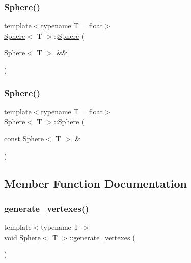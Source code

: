 \subsubsection{\texorpdfstring{Sphere()}{Sphere()}\hspace{0.1cm}{\footnotesize\ttfamily [2/3]}}
{\footnotesize\ttfamily template$<$typename T  = float$>$ \\
\mbox{\hyperlink{classSphere}{Sphere}}$<$ T $>$\+::\mbox{\hyperlink{classSphere}{Sphere}} (\begin{DoxyParamCaption}\item[{\mbox{\hyperlink{classSphere}{Sphere}}$<$ T $>$ \&\&}]{ }\end{DoxyParamCaption})\hspace{0.3cm}{\ttfamily [default]}}

\mbox{\label{classSphere_ae28ad7649c59d653b9e14a3042d186a1}} 
\subsubsection{\texorpdfstring{Sphere()}{Sphere()}\hspace{0.1cm}{\footnotesize\ttfamily [3/3]}}
{\footnotesize\ttfamily template$<$typename T  = float$>$ \\
\mbox{\hyperlink{classSphere}{Sphere}}$<$ T $>$\+::\mbox{\hyperlink{classSphere}{Sphere}} (\begin{DoxyParamCaption}\item[{const \mbox{\hyperlink{classSphere}{Sphere}}$<$ T $>$ \&}]{ }\end{DoxyParamCaption})\hspace{0.3cm}{\ttfamily [default]}}



\subsection{Member Function Documentation}
\mbox{\label{classSphere_a9cfac85b9803fadc4b79db0ea047f679}} 
\subsubsection{\texorpdfstring{generate\+\_\+vertexes()}{generate\_vertexes()}}
{\footnotesize\ttfamily template$<$typename T $>$ \\
void \mbox{\hyperlink{classSphere}{Sphere}}$<$ T $>$\+::generate\+\_\+vertexes (\begin{DoxyParamCaption}{ }\end{DoxyParamCaption})\hspace{0.3cm}{\ttfamily [private]}}

